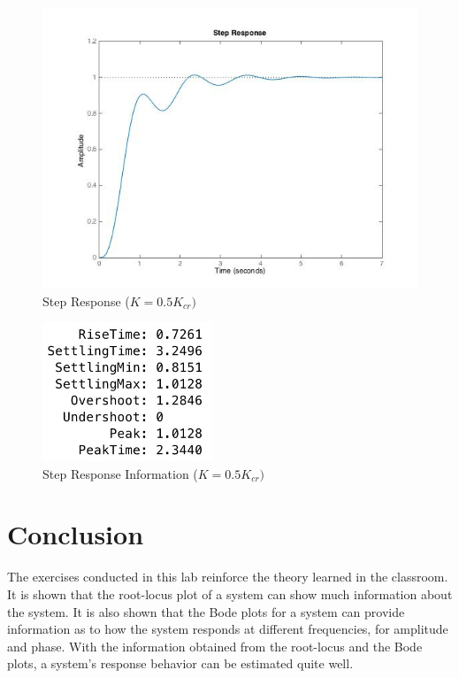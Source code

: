 \documentclass[12pt]{article}
\begin{document}
\newpage

\begin{figure}[h!] %
   \centering
   \includegraphics[width=5in]{system_step_resp_half_critical_k.jpg} 
   \caption{Step Response ($K=0.5K_{cr})$}
   \label{fig:example}
\end{figure}

\begin{figure}[h!] %
   \centering
   \includegraphics[width=2in]{system_step_info_half_critical_k.jpg} 
   \caption{Step Response Information ($K=0.5K_{cr})$}
   \label{fig:example}
\end{figure}


\section*{\fontsize{12}{12}\selectfont \large Conclusion}
The exercises conducted in this lab reinforce the theory learned in the classroom. It is shown that the root-locus plot of a system can show much information about the system. It is also shown that the Bode plots for a system can provide information as to how the system responds at different frequencies, for amplitude and phase. With the information obtained from the root-locus and the Bode plots, a system's response behavior can be estimated quite well.
\end{document}
